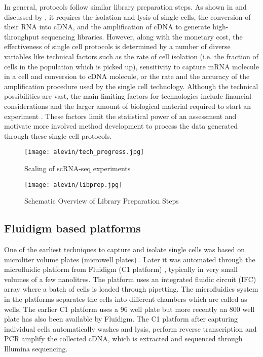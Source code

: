 In general, \singlecell protocols follow similar library preparation steps. As shown in  and discussed by \citep{ziegenhain2017comparative}, it requires the isolation and lysis of single cells, the conversion of their RNA into cDNA, and the amplification of cDNA to generate high-throughput sequencing libraries. However, along with the monetary cost, the effectiveness of single cell protocols is determined by a number of diverse variables like technical factors such as the rate of cell isolation (i.e. the fraction of cells in the population which is picked up), sensitivity to capture mRNA molecule in a cell and conversion to cDNA molecule, or the rate and the accuracy of the amplification procedure used by the single cell technology. Although the technical possibilities are vast, the main limiting factors for \singlecell technologies include financial considerations and the larger amount of biological material required to start an experiment \citep{vieth2017powsimr, ziegenhain2017comparative}. These factors limit the statistical power of an assessment and motivate more involved method development to process the data generated through these single-cell protocols.



\begin{figure*}
 \centering
 \texttt{[image: alevin/tech\_progress.jpg]}
  \caption{Scaling of scRNA-seq experiments \citep{svensson2018exponential}}
  \label{fig:sc-techs}
\end{figure*}

\begin{figure*}
 \centering
 \texttt{[image: alevin/libprep.jpg]}
  \caption{Schematic Overview of Library Preparation Steps \citep{ziegenhain2017comparative}}
  \label{fig:libprep}
\end{figure*}

\subsection{Fluidigm based platforms ~\citep{islam2012highly, hashimshony2012cel}}
\label{intro:fluidigm}

One of the earliest techniques to capture and isolate single cells was based on microliter volume plates (microwell plates) \citep{islam2012highly, hashimshony2012cel}. Later it was automated through the microfluidic platform from Fluidigm (C1 platform) \citep{islam2014}, typically in very small volumes of a few nanolitres. The platform uses an integrated fluidic circuit (IFC) array where a batch of cells is loaded through pipetting. The microfluidics system in the platforms separates the cells into different chambers which are called as wells. The earlier C1 platform uses a 96 well plate but more recently an 800 well plate has also been available by Fluidigm. The C1 platform after capturing individual cells automatically washes and lysis, perform reverse transcription and PCR amplify the collected cDNA, which is extracted and sequenced through Illumina sequencing.

